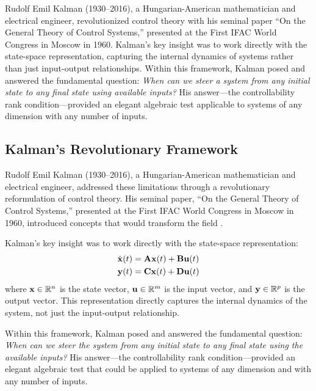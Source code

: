 \begin{historicalbox}
Rudolf Emil Kalman (1930--2016), a Hungarian-American mathematician and electrical engineer, revolutionized control theory with his seminal paper ``On the General Theory of Control Systems,'' presented at the First IFAC World Congress in Moscow in 1960. Kalman's key insight was to work directly with the state-space representation, capturing the internal dynamics of systems rather than just input-output relationships. Within this framework, Kalman posed and answered the fundamental question: \textit{When can we steer a system from any initial state to any final state using available inputs?} His answer---the controllability rank condition---provided an elegant algebraic test applicable to systems of any dimension with any number of inputs.
\end{historicalbox}

\subsection{Kalman's Revolutionary Framework}

Rudolf Emil Kalman (1930--2016), a Hungarian-American mathematician and electrical engineer, addressed these limitations through a revolutionary reformulation of control theory. His seminal paper, ``On the General Theory of Control Systems,'' presented at the First IFAC World Congress in Moscow in 1960, introduced concepts that would transform the field \cite{kalman1960general}.

Kalman's key insight was to work directly with the state-space representation:
\begin{align}
\dot{\mathbf{x}}(t) &= \mathbf{A}\mathbf{x}(t) + \mathbf{B}\mathbf{u}(t) \label{eq:state_eq}\\
\mathbf{y}(t) &= \mathbf{C}\mathbf{x}(t) + \mathbf{D}\mathbf{u}(t) \label{eq:output_eq}
\end{align}
where $\mathbf{x} \in \mathbb{R}^n$ is the state vector, $\mathbf{u} \in \mathbb{R}^m$ is the input vector, and $\mathbf{y} \in \mathbb{R}^p$ is the output vector. This representation directly captures the internal dynamics of the system, not just the input-output relationship.

Within this framework, Kalman posed and answered the fundamental question: \textit{When can we steer the system from any initial state to any final state using the available inputs?} His answer---the controllability rank condition---provided an elegant algebraic test that could be applied to systems of any dimension and with any number of inputs.

